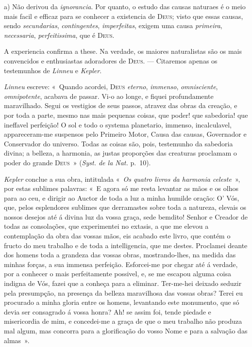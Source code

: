 {a) Não derivou da \emph{ignorancia}. Por quanto, o estudo das causas naturaes é o meio
mais facil e efficaz para se conhecer a existencia de \textsc{Deus}; visto que essas
causas, sendo \emph{secundarias}, \emph{contingentes}, \emph{imperfeitas}, exigem uma
causa \emph{primeira}, \emph{necessaria}, \emph{perfeitissima}, que é \textsc{Deus}.

A experiencia confirma a these. Na verdade, os maiores naturalistas são os mais
convencidos e enthusiastas adoradores de \textsc{Deus}. --- Citaremos apenas os
testemunhos de \emph{Linneu} e \emph{Kepler}.

\emph{Linneu} escreve: «~Quando acordei, \textsc{Deus} \emph{eterno}, \emph{immenso},
\emph{omnisciente}, \emph{omnipotente}, acabava de passar. Vi-o ao longe, e fiquei
profundamente maravilhado. Segui os vestigios de seus passos, atravez das obras da
creação, e por toda a parte, mesmo nas mais pequenas coisas, que poder! que sabedoria!
que ineffavel perfeição! O sol e todo o systema planetario, immenso, incalculavel,
appareceram-me suspensos pelo Primeiro Motor, Causa das
causas, Governador e Conservador do universo. Todas as coisas são, pois, testemunho da
sabedoria divina; a belleza, a harmonia, as justas proporções das creaturas proclamam o
poder do grande \textsc{Deus}~» (\emph{Syst. de la Nat.} p.~10).

\emph{Kepler} conclue a sua obra, intitulada «~\emph{Os quatro livros da harmonia
celeste}~», por estas sublimes palavras: «~E agora só me resta levantar as mãos e os
olhos para ao ceu, e dirigir ao Auctor de toda a luz a minha humilde oração: O' Vós,
que, pelos esplendores sublimes que derramastes sobre toda a natureza, elevais os nossos
desejos até á divina luz da vossa graça, sede bemdito! Senhor e Creador de todas as
consolações, que experimentei no extasis, a que me elevou a contemplação da obra das
vossas mãos, eis acabado este livro, que contém o fructo do meu trabalho e de toda a
intelligencia, que me destes. Proclamei deante dos homens toda a grandeza das vossas
obras, mostrando-lhes, na medida das minhas forças, a sua immensa perfeição.
Esforcei-me por chegar até á verdade, por a conhecer o mais perfeitamente possivel, e,
se me escapou alguma coisa indigna de Vós, fazei que a conheça para a eliminar.
Ter-me-hei deixado seduzir pela presumpção, na presença da belleza maravilhosa das
vossas obras? Terei eu procurado a minha gloria entre os homens, levantando este
monumento, que só devia ser consagrado á vossa honra? Ah! se assim foi, tende piedade e
misericordia de mim, e concedei-me a graça de que o meu trabalho não produza mal algum,
mas concorra para a glorificação do vosso Nome e para a salvação das almas~».

}
